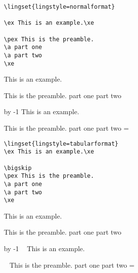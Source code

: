 \documentclass{article}
\begin{document}
\def\specialexno#1{%
   \edef\resetexcnt{\noindent\excnt=\the\excnt}%
   \excnt=#1 \advance\excnt by -1
   \ignorespaces}
\begingroup
{}

\hfil

\begin{verbatim}\lingset{lingstyle=normalformat}

\ex This is an example.\xe

\pex This is the preamble.
\a part one
\a part two
\xe\end{verbatim}

\ex This is an example.\xe

\bigskip
\pex This is the preamble.
\a part one
\a part two
\xe

\specialexno{237}
\ex This is an example.\xe

\bigskip
\pex[belowexskip=0pt] This is the preamble.
\a part one
\a part two
\xe
\resetexcnt
\hfil

\begin{verbatim}\lingset{lingstyle=tabularformat}
\ex This is an example.\xe

\bigskip
\pex This is the preamble.
\a part one
\a part two
\xe\end{verbatim}


\ex This is an example.\xe

\bigskip
\pex This is the preamble.
\a part one
\a part two
\xe

\specialexno{237}
\ex~ This is an example.\xe

\pex~ This is the preamble.
\a part one
\a part two
\xe
\resetexcnt
\hfil
\end{document}
